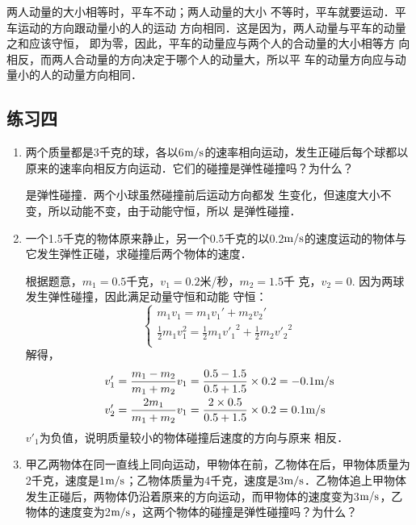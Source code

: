\begin{enumerate}
    \begin{solution}
        两人动量的大小相等时，平车不动；两人动量的大小
        不等时，平车就要运动．平车运动的方向跟动量小的人的运动
        方向相同．这是因为，两人动量与平车的动量之和应该守恒，
        即为零，因此，平车的动量应与两个人的合动量的大小相等方
        向相反，而两人合动量的方向决定于哪个人的动量大，所以平
        车的动量方向应与动量小的人的动量方向相同．
    \end{solution}
\end{enumerate}


\subsection{练习四}
\begin{enumerate}
\item 两个质量都是3千克的球，各以6$\text{m}/\text{s}$的速率相向运动，发生正碰后每个球都以原来的速率向相反方向运动．它们的碰撞是弹性碰撞吗？为什么？


\begin{solution}
    是弹性碰撞．两个小球虽然碰撞前后运动方向都发
    生变化，但速度大小不变，所以动能不变，由于动能守恒，所以
    是弹性碰撞．
\end{solution}
\item 一个1.5千克的物体原来静止，另一个0.5千克的以0.2$\text{m}/\text{s}$的速度运动的物体与它发生弹性正碰，求碰撞后两个物体的速度．

\begin{solution}
根据题意，$m_1=0.5$千克，$v_1=0.2$米/秒，$m_2=1.5$千
克，$v_2=0$. 因为两球发生弹性碰撞，因此满足动量守恒和动能
守恒：
\[\begin{cases}
    m_1v_1=m_1v_1'+m_2v_2'\\
    \frac{1}{2}m_1v_1^2=\frac{1}{2}m_1{v'_1}^2+\frac{1}{2}m_2{v'_2}^2\\
\end{cases}\]
解得，
\[\begin{split}
v'_1&=\frac{m_1-m_2}{m_1+m_2}v_1=\frac{0.5-1.5}{0.5+1.5}\times 0.2=-0.1\text{m}/\text{s}\\
v'_2&=\frac{2m_1}{m_1+m_2}v_1=\frac{2\times 0.5}{0.5+1.5}\times 0.2=0.1\text{m}/\text{s}\\
\end{split}\]
$v'_1$为负值，说明质量较小的物体碰撞后速度的方向与原来
相反．
\end{solution}
\item 甲乙两物体在同一直线上同向运动，甲物体在前，乙物体在后，甲物体质量为2千克，速度是1$\text{m}/\text{s}$；乙物体质量为4千克，速度是3$\text{m}/\text{s}$．乙物体追上甲物体发生正碰后，两物体仍沿着原来的方向运动，而甲物体的速度变为3$\text{m}/\text{s}$，乙物体的速度变为2$\text{m}/\text{s}$，这两个物体的碰撞是弹性碰撞吗？为什么？


\end{enumerate}
